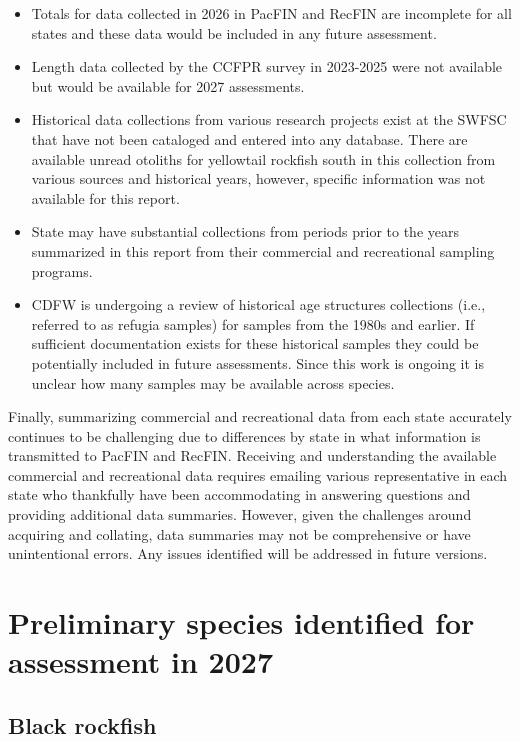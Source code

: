 \documentclass[
  english,
]{article}
\begin{document}
\begin{itemize}
\item
  Totals for data collected in 2026 in PacFIN and RecFIN are incomplete
  for all states and these data would be included in any future
  assessment.
\item
  Length data collected by the CCFPR survey in 2023-2025 were not
  available but would be available for 2027 assessments.
\item
  Historical data collections from various research projects exist at
  the SWFSC that have not been cataloged and entered into any database.
  There are available unread otoliths for yellowtail rockfish south in
  this collection from various sources and historical years, however,
  specific information was not available for this report.
\item
  State may have substantial collections from periods prior to the years
  summarized in this report from their commercial and recreational
  sampling programs.
\item
  CDFW is undergoing a review of historical age structures collections
  (i.e., referred to as refugia samples) for samples from the 1980s and
  earlier. If sufficient documentation exists for these historical
  samples they could be potentially included in future assessments.
  Since this work is ongoing it is unclear how many samples may be
  available across species.
\end{itemize}

Finally, summarizing commercial and recreational data from each state
accurately continues to be challenging due to differences by state in
what information is transmitted to PacFIN and RecFIN. Receiving and
understanding the available commercial and recreational data requires
emailing various representative in each state who thankfully have been
accommodating in answering questions and providing additional data
summaries. However, given the challenges around acquiring and collating,
data summaries may not be comprehensive or have unintentional errors.
Any issues identified will be addressed in future versions.

\newpage{}

\section{Preliminary species identified for assessment in
2027}\label{preliminary-species-identified-for-assessment-in-2027}

\subsection{Black rockfish}\label{black-rockfish}
\end{document}
